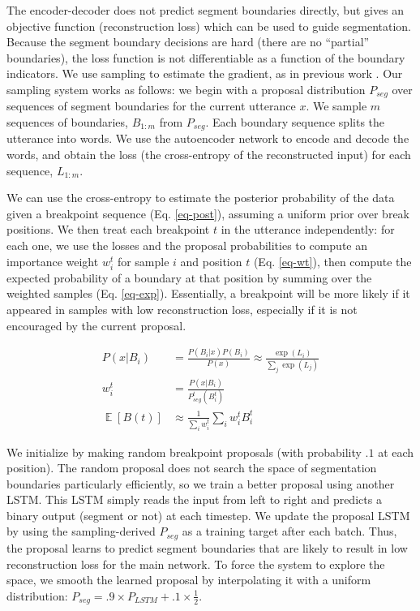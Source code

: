 \documentclass[11pt,letterpaper]{article}
\DeclareMathOperator*{\Exp}{\mathbb{E}}
\begin{document}
The encoder-decoder does not predict segment boundaries directly, but
gives an objective function (reconstruction loss) which can be used to
guide segmentation. Because the segment boundary decisions are hard
(there are no ``partial'' boundaries), the loss function is not
differentiable as a function of the boundary indicators. We use
sampling to estimate the gradient, as in previous work
\cite{Mnih14,Xu15}. Our sampling system works as follows: we
begin with a proposal distribution $P_{seg}$ over sequences of segment
boundaries for the current utterance $x$. We sample $m$ sequences of
boundaries, $B_{1:m}$ from $P_{seg}$. Each boundary sequence splits
the utterance into words. We use the autoencoder network to encode and
decode the words, and obtain the loss (the cross-entropy of the
reconstructed input) for each sequence, $L_{1:m}$.

We can use the cross-entropy to estimate the posterior probability of
the data given a breakpoint sequence (Eq. \ref{eq-post}), assuming a
uniform prior over break positions. We then treat each breakpoint $t$
in the utterance independently: for each one, we use the losses and
the proposal probabilities to compute an importance weight $w_i^t$ for
sample $i$ and position $t$ (Eq. \ref{eq-wt}), then compute the
expected probability of a boundary at that position by summing over
the weighted samples (Eq. \ref{eq-exp}).  Essentially, a breakpoint
will be more likely if it appeared in samples with low reconstruction
loss, especially if it is not encouraged by the current proposal.

\begin{align}
P(x|B_i) &= \frac{P(B_i|x)P(B_i)}{P(x)} \approx \frac{\exp(L_i)}{\sum_j
  \exp(L_j)}
\label{eq-post}\\
w_i^t &= \frac{P(x|B_i)}{P_{seg}^t(B_i^t)}
\label{eq-wt}\\
\Exp[B(t)] &\approx \frac{1}{\sum_i w_i^t} \sum_i w_i^t B_i^t
\label{eq-exp}
\end{align}

We initialize by making random breakpoint proposals (with probability
$.1$ at each position). The random proposal does not search the space
of segmentation boundaries particularly efficiently, so we train a
better proposal using another LSTM. This LSTM simply reads the input
from left to right and predicts a binary output (segment or not) at
each timestep. We update the proposal LSTM by using the
sampling-derived $P_{seg}$ as a training target after each
batch. Thus, the proposal learns to predict segment boundaries that
are likely to result in low reconstruction loss for the main
network. To force the system to explore the space, we smooth the
learned proposal by interpolating it with a uniform distribution:
$P_{seg} = .9 \times P_{LSTM} + .1 \times \frac{1}{2}$.
\end{document}
